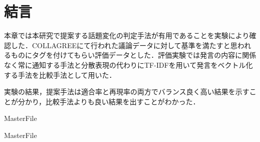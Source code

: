 \section{結言}
\label{exp:conclusion}
本章では本研究で提案する話題変化の判定手法が有用であることを実験により確認した．COLLAGREEにて行われた議論データに対して基準を満たすと思われるものにタグを付けてもらい評価データとした．評価実験では発言の内容に関係なく常に通知する手法と分散表現の代わりにTF-IDFを用いて発言をベクトル化する手法を比較手法として用いた．

実験の結果，提案手法は適合率と再現率の両方でバランス良く高い結果を示すことが分かり，比較手法よりも良い結果を出すことがわかった．

 \expandafter\ifx\csname MasterFile\endcsname\relax
	\def\BibFile{hoge}
	
  \fi
  \expandafter\ifx\csname MasterFile\endcsname\relax

\fi

